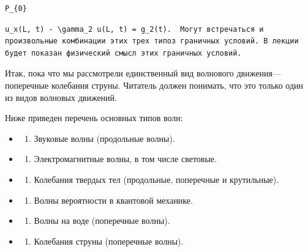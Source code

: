 \documentclass[
  ukrainian,
]{article}
\providecommand{\tightlist}{%
  \setlength{\itemsep}{0pt}\setlength{\parskip}{0pt}}
\begin{document}
\begin{verbatim}
P_{0}
\end{verbatim}

\begin{verbatim}
u_x(L, t) - \gamma_2 u(L, t) = g_2(t).  Могут встречаться и произвольные комбинации этих трех типоз граничных условий. В лекции будет показан физический смысл этих граничных условий.
\end{verbatim}

Итак, пока что мы рассмотрели единственный вид волнового
движения---поперечные колебания струны. Читатель должен понимать, что
это только один из видов волновых движений.

Ниже приведен перечень основных типов волн:

\begin{itemize}
\tightlist
\item
  \begin{enumerate}
  \def\labelenumi{\arabic{enumi}.}
  \tightlist
  \item
    Звуковые волны (продольные волны).
  \end{enumerate}
\item
  \begin{enumerate}
  \def\labelenumi{\arabic{enumi}.}
  \setcounter{enumi}{1}
  \tightlist
  \item
    Электромагнитные волны, в том числе световые.
  \end{enumerate}
\item
  \begin{enumerate}
  \def\labelenumi{\arabic{enumi}.}
  \setcounter{enumi}{2}
  \tightlist
  \item
    Колебания твердых тел (продольные, поперечные и крутильные).
  \end{enumerate}
\item
  \begin{enumerate}
  \def\labelenumi{\arabic{enumi}.}
  \setcounter{enumi}{3}
  \tightlist
  \item
    Волны вероятности в квантовой механике.
  \end{enumerate}
\item
  \begin{enumerate}
  \def\labelenumi{\arabic{enumi}.}
  \setcounter{enumi}{4}
  \tightlist
  \item
    Волны на воде (поперечные волны).
  \end{enumerate}
\item
  \begin{enumerate}
  \def\labelenumi{\arabic{enumi}.}
  \setcounter{enumi}{5}
  \tightlist
  \item
    Колебания струны (поперечные волны).
  \end{enumerate}
\end{itemize}
\end{document}
